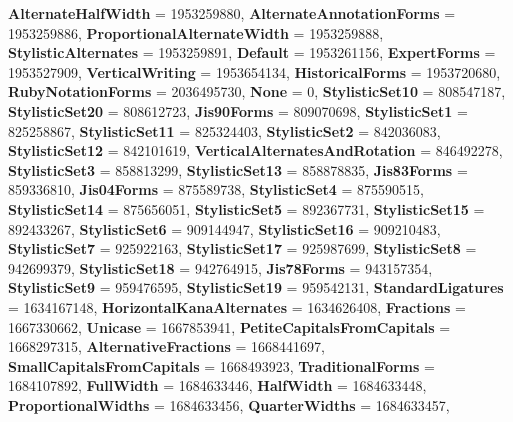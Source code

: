 \begin{DoxyCompactItemize}
{\bfseries Alternate\+Half\+Width} = 1953259880, 
{\bfseries Alternate\+Annotation\+Forms} = 1953259886, 
{\bfseries Proportional\+Alternate\+Width} = 1953259888, 
\newline
{\bfseries Stylistic\+Alternates} = 1953259891, 
{\bfseries Default} = 1953261156, 
{\bfseries Expert\+Forms} = 1953527909, 
{\bfseries Vertical\+Writing} = 1953654134, 
\newline
{\bfseries Historical\+Forms} = 1953720680, 
{\bfseries Ruby\+Notation\+Forms} = 2036495730, 
{\bfseries None} = 0, 
{\bfseries Stylistic\+Set10} = 808547187, 
\newline
{\bfseries Stylistic\+Set20} = 808612723, 
{\bfseries Jis90\+Forms} = 809070698, 
{\bfseries Stylistic\+Set1} = 825258867, 
{\bfseries Stylistic\+Set11} = 825324403, 
\newline
{\bfseries Stylistic\+Set2} = 842036083, 
{\bfseries Stylistic\+Set12} = 842101619, 
{\bfseries Vertical\+Alternates\+And\+Rotation} = 846492278, 
{\bfseries Stylistic\+Set3} = 858813299, 
\newline
{\bfseries Stylistic\+Set13} = 858878835, 
{\bfseries Jis83\+Forms} = 859336810, 
{\bfseries Jis04\+Forms} = 875589738, 
{\bfseries Stylistic\+Set4} = 875590515, 
\newline
{\bfseries Stylistic\+Set14} = 875656051, 
{\bfseries Stylistic\+Set5} = 892367731, 
{\bfseries Stylistic\+Set15} = 892433267, 
{\bfseries Stylistic\+Set6} = 909144947, 
\newline
{\bfseries Stylistic\+Set16} = 909210483, 
{\bfseries Stylistic\+Set7} = 925922163, 
{\bfseries Stylistic\+Set17} = 925987699, 
{\bfseries Stylistic\+Set8} = 942699379, 
\newline
{\bfseries Stylistic\+Set18} = 942764915, 
{\bfseries Jis78\+Forms} = 943157354, 
{\bfseries Stylistic\+Set9} = 959476595, 
{\bfseries Stylistic\+Set19} = 959542131, 
\newline
{\bfseries Standard\+Ligatures} = 1634167148, 
{\bfseries Horizontal\+Kana\+Alternates} = 1634626408, 
{\bfseries Fractions} = 1667330662, 
{\bfseries Unicase} = 1667853941, 
\newline
{\bfseries Petite\+Capitals\+From\+Capitals} = 1668297315, 
{\bfseries Alternative\+Fractions} = 1668441697, 
{\bfseries Small\+Capitals\+From\+Capitals} = 1668493923, 
{\bfseries Traditional\+Forms} = 1684107892, 
\newline
{\bfseries Full\+Width} = 1684633446, 
{\bfseries Half\+Width} = 1684633448, 
{\bfseries Proportional\+Widths} = 1684633456, 
{\bfseries Quarter\+Widths} = 1684633457, 

\end{DoxyCompactItemize}
